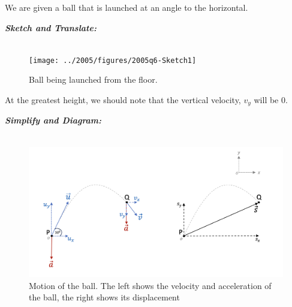%
%
%


\begin{subquestions}

We are given a ball that is launched at an angle to the horizontal.
	
\subquestion
	
\textbf{\textit{Sketch and Translate:}} \\ \\
\begin{figure}[H]
	\begin{center}
		\texttt{[image: ../2005/figures/2005q6-Sketch1]}
		\caption{\label{2005:q6:Sketch1} Ball being launched from the floor.}
	\end{center}
\end{figure}	
At the greatest height, we should note that the vertical velocity, $v_y$ will be 0.




\textbf{\textit{Simplify and Diagram:}} \\ \\ 
\begin{figure}[H] 
	\begin{center}
		\hspace{20pt}\includegraphics[scale=1.2]{../2005/figures/2005q6-Diagram1}
		\caption{\label{2005:q6:Diagram1} Motion of the ball. The left shows the velocity and acceleration of the ball, the right shows its displacement}
	\end{center}
\end{figure}


\end{subquestions}
